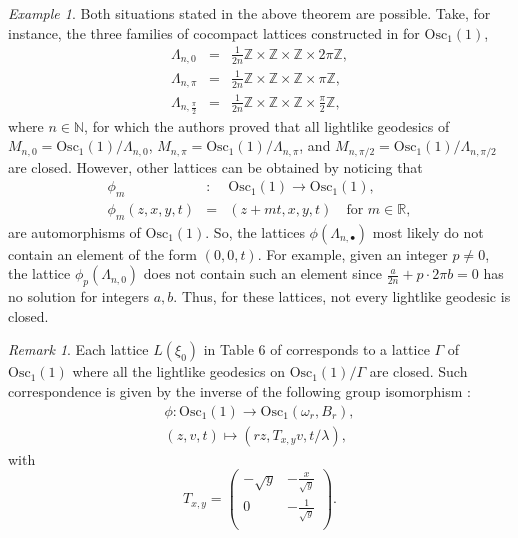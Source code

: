 \documentclass[12pt]{amsart}
\theoremstyle{plain}
\theoremstyle{definition}
\theoremstyle{remark}
\newtheorem{rem}{Remark}
\newtheorem{exa}[thm]{Example}
\begin{document}
\begin{exa}\label{Lattice4}
    Both situations stated in the above theorem are possible. Take, for instance, the three families of cocompact lattices constructed in \cite{BOV} for \( \text{Osc}_1(1) \),
    \begin{eqnarray*} \label{geodlight}
        \Lambda_{n,0} &=& \frac{1}{2n}\mathbb{Z} \times \mathbb{Z} \times \mathbb{Z} \times 2\pi \mathbb{Z},\\
        \Lambda_{n,\pi} &=& \frac{1}{2n}\mathbb{Z} \times \mathbb{Z} \times \mathbb{Z} \times \pi \mathbb{Z},\\
        \Lambda_{n,\frac{\pi}{2}} &=& \frac{1}{2n}\mathbb{Z} \times \mathbb{Z} \times \mathbb{Z} \times \frac{\pi}{2} \mathbb{Z},
    \end{eqnarray*}
    where \( n \in \mathbb{N} \), for which the authors proved that all lightlike geodesics of \( M_{n,0} = \text{Osc}_1(1)/\Lambda_{n,0} \), \( M_{n,\pi} = \text{Osc}_1(1)/\Lambda_{n,\pi} \), and \( M_{n,\pi/2} = \text{Osc}_1(1)/\Lambda_{n,\pi/2} \) are closed. However, other lattices can be obtained by noticing that
    \begin{eqnarray*}
        \phi_m &:& \text{Osc}_1(1) \rightarrow \text{Osc}_1(1),\\
        \phi_m(z, x, y, t) &=& (z + mt, x, y, t) \quad \text{for } m \in \mathbb{R},
    \end{eqnarray*}
    are automorphisms of \( \text{Osc}_1(1) \). So, the lattices \( \phi(\Lambda_{n,\bullet}) \) most likely do not contain an element of the form \( (0, 0, t) \). For example, given an integer \( p \neq 0 \), the lattice \( \phi_p(\Lambda_{n,0}) \) does not contain such an element since \( \frac{a}{2n} + p \cdot 2\pi b = 0 \) has no solution for integers \( a, b \). Thus, for these lattices, not every lightlike geodesic is closed.
\end{exa}

\begin{rem}
    Each lattice \( L(\xi_0) \) in Table 6 of \cite{MF} corresponds to a lattice \( \Gamma \) of \( \text{Osc}_1(1) \) where all the lightlike geodesics on \( \text{Osc}_1(1)/\Gamma \) are closed. Such correspondence is given by the inverse of the following group isomorphism \cite{MF}:
    \begin{eqnarray*}
        \phi: \text{Osc}_1(1) \rightarrow \text{Osc}_1(\omega_r, B_r), \\
        (z, v, t) \mapsto (r z, T_{x,y} v, t/\lambda),
    \end{eqnarray*}
    with
    \[
    T_{x,y} = \left( \begin{matrix}
        -\sqrt{y} & -\frac{x}{\sqrt{y}} \\
        0 & -\frac{1}{\sqrt{y}} \\
    \end{matrix} \right).
    \]
\end{rem}
\end{document}

